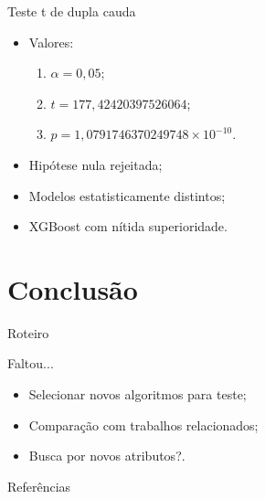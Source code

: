\documentclass{beamer}
\begin{document}
\begin{frame}{Teste t de dupla cauda}

    \begin{itemize}
        \setlength{\itemsep}{10pt}
        \item Valores:
        \begin{enumerate}
            \setlength{\itemsep}{10pt}
            \item \(\alpha = 0,05\);
            \item \(t = 177,42420397526064\);
            \item \(p = 1,0791746370249748 \times 10^{-10}\).
        \end{enumerate}
        \item Hipótese nula rejeitada;
        \item Modelos estatisticamente distintos;
        \item XGBoost com nítida superioridade.
    \end{itemize}
    
\end{frame}

\section{Conclusão}

\begin{frame}{Roteiro} 
     \tableofcontents[currentsection]
\end{frame}

\begin{frame}{Faltou...}

    \begin{itemize}
        \setlength{\itemsep}{10pt}
        \item Selecionar novos algoritmos para teste;
        \item Comparação com trabalhos relacionados;
        \item Busca por novos atributos?.
    \end{itemize}
    
\end{frame}

\begin{frame}{Referências}
    \scriptsize
    
\end{frame}
\end{document}
